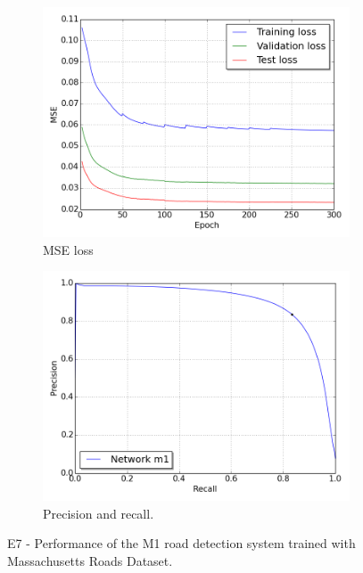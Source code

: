 \begin{figure}
\begin{subfigure}{0.5\textwidth}
\includegraphics[width=\linewidth]{figs/E7/E7_lc_loss.png}
\caption{MSE loss} \label{fig:E7_performance_mass_lc}
\end{subfigure}
\hspace*{\fill} %
\begin{subfigure}{0.5\textwidth}
\includegraphics[width=\linewidth]{figs/E7/E7_pr.png}
\caption{Precision and recall.} \label{fig:E7_performance_mass_pr}
\end{subfigure}
\hspace*{\fill} %
\caption[E7 - Performance of the M1 road detection system trained with Massachusetts Roads Dataset]{E7 - Performance of the M1 road detection system trained with Massachusetts Roads Dataset.} \label{fig:E7_performance_mass}
\end{figure}

